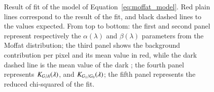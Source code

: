\begin{figure}[h]
     \centering
     \caption{Result of fit of the model of Equation~\ref{eq:moffat_model}. Red plain lines correspond to the result of the fit, and black dashed lines to the values expected. From top to bottom: the first and second panel represent respectively the $\alpha(\lambda)$ and $\beta(\lambda)$ parameters from the Moffat distribution; the third panel shows the background contribution per pixel and its mean value in red, while the dark dashed line is the mean value of the dark ; the fourth panel represents $K_{G/A}(\lambda)$, and $K_{G_1/G_0}(\lambda)$; the fifth panel represents the reduced chi-squared of the fit.}
     \label{fig:result_params}
\end{figure}

%
%
%
%

